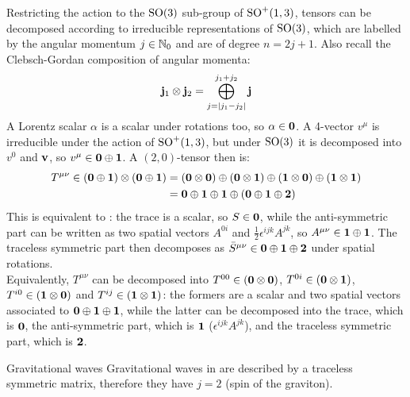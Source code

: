 Restricting the action to the $ \mathrm{SO}(3) $ sub-group of $ \mathrm{SO}^+(1,3) $, tensors can be decomposed according to irreducible representations of $ \mathrm{SO}(3) $, which are labelled by the angular momentum $ j \in \mathbb{N}_0 $ and are of degree $ n = 2j + 1 $. Also recall the Clebsch-Gordan composition of angular momenta:
\begin{equation}
  \mathbf{j}_1 \otimes \mathbf{j}_2 = \bigoplus_{j = \left\lvert j_1 - j_2\right\rvert}^{j_1 + j_2} \mathbf{j}
\end{equation}
A Lorentz scalar $ \alpha $ is a scalar under rotations too, so $ \alpha \in \mathbf{0} $. A 4-vector $ v^\mu $ is irreducible under the action of $ \mathrm{SO}^+(1,3) $, but under $ \mathrm{SO}(3) $ it is decomposed into $ v^0 $ and $ \mathbf{v} $, so $ v^\mu \in \mathbf{0} \oplus \mathbf{1} $. A $ (2,0) $-tensor then is:
\begin{equation*}
  \begin{split}
    T^{\mu \nu} \in \left( \mathbf{0} \oplus \mathbf{1} \right) \otimes \left( \mathbf{0} \oplus \mathbf{1} \right)
    &= \left( \mathbf{0} \otimes \mathbf{0} \right) \oplus \left( \mathbf{0} \otimes \mathbf{1} \right) \oplus \left( \mathbf{1} \otimes \mathbf{0} \right) \oplus \left( \mathbf{1} \otimes \mathbf{1} \right) \\
    &= \mathbf{0} \oplus \mathbf{1} \oplus \mathbf{1} \oplus \left( \mathbf{0} \oplus \mathbf{1} \oplus \mathbf{2} \right)
  \end{split}
\end{equation*}
This is equivalent to : the trace is a scalar, so $ S \in \mathbf{0} $, while the anti-symmetric part can be written as two spatial vectors $ A^{0i} $ and $ \frac{1}{2} \epsilon^{ijk} A^{jk} $, so $ A^{\mu \nu} \in \mathbf{1} \oplus \mathbf{1} $. The traceless symmetric part then decomposes as $ \bar{S}^{\mu \nu} \in \mathbf{0} \oplus \mathbf{1} \oplus \mathbf{2} $ under spatial rotations.\\
Equivalently, $ T^{\mu \nu} $ can be decomposed into $ T^{00} \in \left( \mathbf{0} \otimes \mathbf{0} \right) $, $ T^{0i} \in \left( \mathbf{0} \otimes \mathbf{1} \right) $, $ T^{i0} \in \left( \mathbf{1} \otimes \mathbf{0} \right) $ and $ T^{ij} \in \left( \mathbf{1} \otimes \mathbf{1} \right) $: the formers are a scalar and two spatial vectors associated to $ \mathbf{0} \oplus \mathbf{1} \oplus \mathbf{1} $, while the latter can be decomposed into the trace, which is $ \mathbf{0} $, the anti-symmetric part, which is $ \mathbf{1} $ ($ \epsilon^{ijk} A^{jk} $), and the traceless symmetric part, which is $ \mathbf{2} $.

\begin{example}{Gravitational waves}{}
  Gravitational waves in  are described by a traceless symmetric matrix, therefore they have $ j = 2 $ (spin of the graviton).
\end{example}

